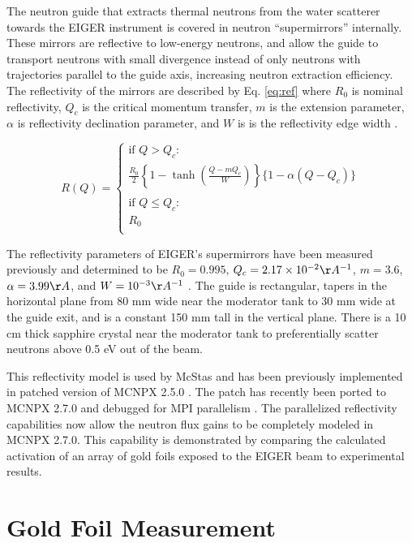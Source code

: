 \documentclass[a4paper,
              ]{jacow}
\begin{document}
The neutron guide that extracts thermal neutrons from the water scatterer towards the EIGER instrument is covered in neutron ``supermirrors'' internally.  These mirrors are reflective to low-energy neutrons, and allow the guide to transport neutrons with small divergence instead of only neutrons with trajectories parallel to the guide axis, increasing neutron extraction efficiency.  The reflectivity of the mirrors are described by Eq. \ref{eq:ref} where $R_0$ is nominal reflectivity, $Q_c$ is the critical momentum transfer, $m$ is the extension parameter, $\alpha$ is reflectivity declination parameter, and $W$ is is the reflectivity edge width \cite{mcnpx-ref}.

\begin{equation}\label{eq:ref}
R(Q) = 
\begin{cases}
    \mbox{if } Q > Q_c : \\
    \frac{R_0}{2}\left\{  1 - \tanh\left(  \frac{Q - m Q_c}{W}\right) \right\}\{1-\alpha(Q-Q_c)\} \\
    \\
    \mbox{if } Q \leq Q_c :\\
    R_0 \\
\end{cases}
\end{equation}

The reflectivity parameters of EIGER's supermirrors have been measured previously and determined to be $R_0=0.995$, $Q_c=2.17\times10^{-2}\AA^{-1}$, $m=3.6$, $\alpha=3.99 \AA$, and $W=10^{-3} \AA^{-1}$ \cite{eiger-uwe}.  The guide is rectangular, tapers in the horizontal plane from 80 mm wide near the moderator tank to 30 mm wide at the guide exit, and is a constant 150 mm tall in the vertical plane.  There is a 10 cm thick sapphire crystal near the moderator tank to preferentially scatter neutrons above 0.5 eV out of the beam.

This reflectivity model is used by McStas and has been previously implemented in patched version of MCNPX 2.5.0 \cite{mcnpx-ref}.  The patch has recently been ported to MCNPX 2.7.0 and debugged for MPI parallelism \cite{mcnpx270}.  The parallelized reflectivity capabilities now allow the neutron flux gains to be completely modeled in MCNPX 2.7.0.  This capability is demonstrated by comparing the calculated activation of an array of gold foils exposed to the EIGER beam to experimental results.

\section{Gold Foil Measurement}
\end{document}
